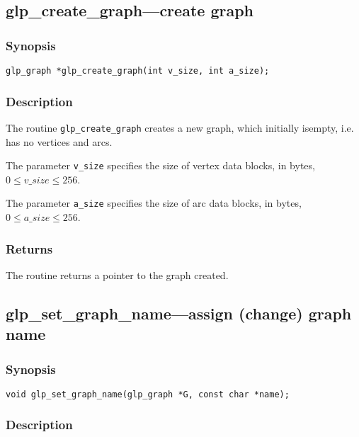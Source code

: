 \subsection{glp\_create\_graph---create graph}

\subsubsection*{Synopsis}

\begin{verbatim}
glp_graph *glp_create_graph(int v_size, int a_size);
\end{verbatim}

\subsubsection*{Description}

The routine \verb|glp_create_graph| creates a new graph, which
initially is\linebreak empty, i.e. has no vertices and arcs.

The parameter \verb|v_size| specifies the size of vertex data blocks,
in bytes, $0\leq v\_size\leq 256$.

The parameter \verb|a_size| specifies the size of arc data blocks, in
bytes, $0\leq a\_size\leq 256$.

\subsubsection*{Returns}

The routine returns a pointer to the graph created.

\subsection{glp\_set\_graph\_name---assign (change) graph name}

\subsubsection*{Synopsis}

\begin{verbatim}
void glp_set_graph_name(glp_graph *G, const char *name);
\end{verbatim}

\subsubsection*{Description}

